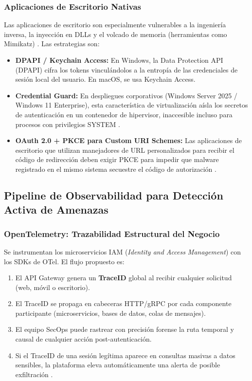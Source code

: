 \documentclass[12pt, a4paper]{article}
\begin{document}
\subsubsection{Aplicaciones de Escritorio Nativas}

Las aplicaciones de escritorio son especialmente vulnerables a la ingeniería
inversa, la inyección en DLLs y el volcado de memoria (herramientas como
Mimikatz) \cite{chudovo2025}. Las estrategias son:

\begin{itemize}[noitemsep]
  \item \textbf{DPAPI / Keychain Access:} En Windows, la Data Protection API
        (DPAPI) cifra los tokens vinculándolos a la entropía de las credenciales
        de sesión local del usuario. En macOS, se usa Keychain Access.
  \item \textbf{Credential Guard:} En despliegues corporativos (Windows
        Server 2025 / Windows 11 Enterprise), esta característica de
        virtualización aísla los secretos de autenticación en un contenedor
        de hipervisor, inaccesible incluso para procesos con privilegios
        SYSTEM \cite{microsoft2025}.
  \item \textbf{OAuth 2.0 + PKCE para Custom URI Schemes:} Las aplicaciones
        de escritorio que utilizan manejadores de URL personalizados para recibir
        el código de redirección deben exigir PKCE para impedir que malware
        registrado en el mismo sistema secuestre el código de autorización
        \cite{srivathsav2025}.
\end{itemize}

\subsection{Pipeline de Observabilidad para Detección Activa de Amenazas}

\subsubsection{OpenTelemetry: Trazabilidad Estructural del Negocio}

Se instrumentan los microservicios IAM (\textit{Identity and Access Management})
con los SDKs de OTel. El flujo propuesto es:

\begin{enumerate}[noitemsep]
  \item El API Gateway genera un \textbf{TraceID} global al recibir cualquier
        solicitud (web, móvil o escritorio).
  \item El TraceID se propaga en cabeceras HTTP/gRPC por cada componente
        participante (microservicios, bases de datos, colas de mensajes).
  \item El equipo SecOps puede rastrear con precisión forense la ruta temporal
        y causal de cualquier acción post-autenticación.
  \item Si el TraceID de una sesión legítima aparece en consultas masivas a
        datos sensibles, la plataforma eleva automáticamente una alerta de
        posible exfiltración \cite{opentelemetry,horovits2025,thenewstack2025}.
\end{enumerate}
\end{document}
